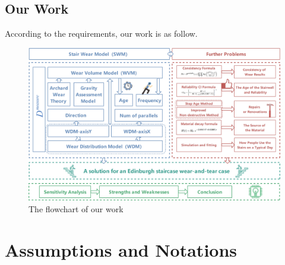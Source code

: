 \documentclass[12pt]{article}  %
\numberwithin{equation}{section} %
\begin{document}
\subsection{Our Work}
According to the requirements, our work is as follow.
\begin{figure}[H]
	\centering
	\includegraphics[width=1\linewidth]{美赛Latex模板/flowchat(Ourwork).jpg}
	\caption{The flowchart of our work}
	\label{ourwork_flowchart}
\end{figure}

\section{Assumptions and Notations}
\end{document}
